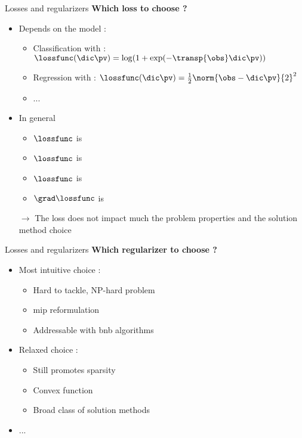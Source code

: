\begin{frame}{Losses and regularizers}
    \textbf{Which loss to choose ?}
    \begin{itemize}
        \item Depends on the model :
        \pause
        \begin{itemize}
            \item Classification with  : $\lossfunc(\dic\pv) = \log(1+\exp(-\transp{\obs}\dic\pv))$
            \pause
            \item Regression with \emphone{$\obs \in \kR^{\ddim}$} : $\lossfunc(\dic\pv) = \tfrac{1}{2}\norm{\obs-\dic\pv}{2}^2$
            \pause
            \item ...
        \end{itemize}
        \pause
        \item In general 
        \begin{itemize}
            \item $\lossfunc$ is 
            \pause
            \item $\lossfunc$ is 
            \pause
            \item $\lossfunc$ is 
            \pause
            \item $\grad\lossfunc$ is 
        \end{itemize}
        \pause
        \item[$\rightarrow$] The loss does not impact much the problem properties and the solution method choice
    \end{itemize}
\end{frame}

\begin{frame}{Losses and regularizers}
    \textbf{Which regularizer to choose ?}
    \begin{itemize}
        \item Most intuitive choice : 
        \pause
        \begin{itemize}
            \item Hard to tackle, NP-hard problem
            \pause
            \item \gls{mip} reformulation
            \pause
            \item Addressable with \gls{bnb} algorithms
        \end{itemize}
        \pause
        \item Relaxed choice : 
        \begin{itemize}
            \item Still promotes sparsity
            \pause
            \item Convex function
            \pause
            \item Broad class of solution methods
        \end{itemize}
        \pause
        \item ...
    \end{itemize}
\end{frame}
